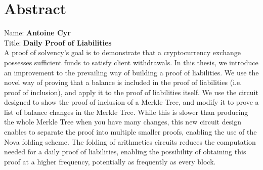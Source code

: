 
\chapter*{Abstract}

Name: 	\tab \textbf{Antoine Cyr} \\
Title: 	\tab \textbf{Daily Proof of Liabilities}\\

A proof of solvency's goal is to demonstrate that a cryptocurrency exchange possesses sufficient funds to satisfy client withdrawals. In this thesis, we introduce an improvement to the prevailing way of building a proof of liabilities. We use the novel way of proving that a balance is included in the proof of liabilities (i.e. proof of inclusion), and apply it to the proof of liabilities itself.
We use the circuit designed to show the proof of inclusion of a Merkle Tree, and modify it to prove a list of balance changes in the Merkle Tree. While this is slower than producing the whole Merkle Tree when you have many changes, this new circuit design enables to separate the proof into multiple smaller proofs, enabling the use of the Nova folding scheme. The folding of arithmetics circuits reduces the computation needed for a daily proof of liabilities, enabling the possibility of obtaining this proof at a higher frequency, potentially as frequently as every block.



